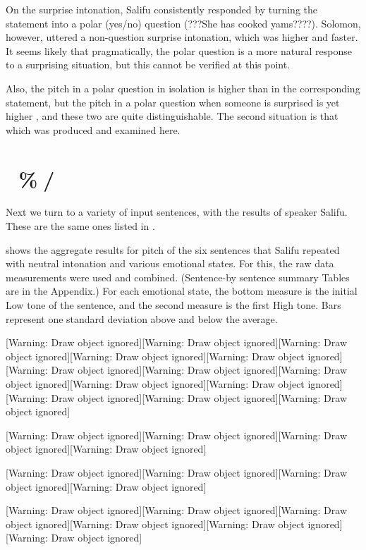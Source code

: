\documentclass[output=paper]{langsci/langscibook}
\begin{document}
On the surprise intonation, Salifu consistently responded by turning the statement into a polar (yes/no) question (???She has cooked yams????). Solomon, however, uttered a non-question surprise intonation, which was higher and faster. It seems likely that pragmatically, the polar question is a more natural response to a surprising situation, but this cannot be verified at this point. 

Also, the pitch in a polar question in isolation is higher than in the corresponding statement, but the pitch in a polar question when someone is surprised is yet higher \citep{Cahill2012}, and these two are quite distinguishable. The second situation is that which was produced and examined here.

\section{ \%/}
\begin{styleBodyTextIndent}
Next we turn to a variety of input sentences, with the results of speaker Salifu. These are the same ones listed in .
\end{styleBodyTextIndent}

 shows the aggregate results for pitch of the six sentences that Salifu repeated with neutral intonation and various emotional states. For this, the raw data measurements were used and combined. (Sentence-by sentence summary Tables are in the Appendix.) For each emotional state, the bottom measure is the initial Low tone of the sentence, and the second measure is the first High tone. Bars represent one standard deviation above and below the average.

[Warning: Draw object ignored][Warning: Draw object ignored][Warning: Draw object ignored][Warning: Draw object ignored][Warning: Draw object ignored][Warning: Draw object ignored][Warning: Draw object ignored][Warning: Draw object ignored][Warning: Draw object ignored][Warning: Draw object ignored][Warning: Draw object ignored][Warning: Draw object ignored][Warning: Draw object ignored]

[Warning: Draw object ignored][Warning: Draw object ignored][Warning: Draw object ignored][Warning: Draw object ignored]

[Warning: Draw object ignored][Warning: Draw object ignored][Warning: Draw object ignored][Warning: Draw object ignored]

[Warning: Draw object ignored][Warning: Draw object ignored][Warning: Draw object ignored][Warning: Draw object ignored][Warning: Draw object ignored][Warning: Draw object ignored]
\end{document}
